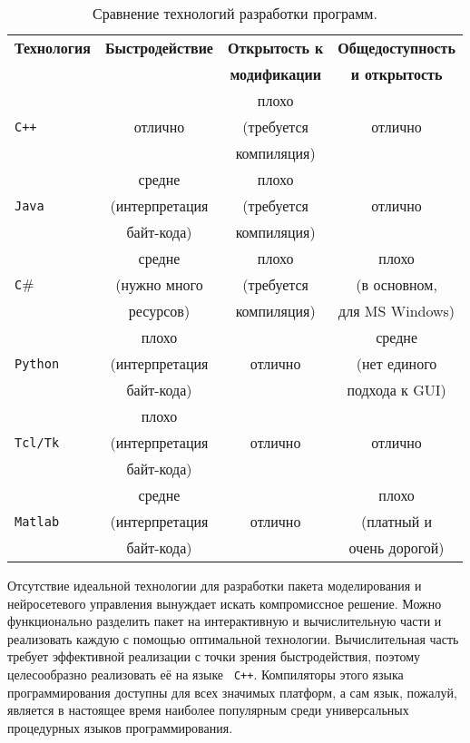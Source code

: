 \begin{table}[ht]
\centering
\caption{Сравнение технологий разработки программ.}
\label{tabl:sdk_tech}
\begin{tabular}{|l|c|c|c|}
\hline
\bf Технология & \bf Быстродействие & \bf Открытость к & \bf Общедоступность \\
             &                & \bf модификации  & \bf и открытость \\
\hline
             &                &  плохо       &              \\
\tt C++      &   отлично      & (требуется   & отлично      \\
             &                & компиляция)  &              \\
\hline
             &   средне       &  плохо       &              \\
\tt Java     & (интерпретация & (требуется   & отлично      \\
             & байт-кода)     & компиляция)  &              \\
\hline
             &   средне       &  плохо       & плохо        \\
\tt C$\#$    & (нужно много   & (требуется   & (в основном, \\
             & ресурсов)      & компиляция)  & для MS Windows) \\
\hline
            &   плохо        &              & средне       \\
\tt Python  & (интерпретация & отлично      & (нет единого \\
            & байт-кода)     &              & подхода к GUI) \\
\hline
           &   плохо        &              &              \\
\tt Tcl/Tk & (интерпретация & отлично      & отлично      \\
           & байт-кода)     &              &              \\
\hline
           &   средне       &              & плохо        \\
\tt Matlab & (интерпретация & отлично      & (платный и   \\
           & байт-кода)     &              & очень дорогой) \\
\hline
\end{tabular}
\end{table}

Отсутствие идеальной технологии для разработки пакета моделирования и
нейросетевого управления вынуждает искать компромиссное решение.
Можно функционально разделить пакет на интерактивную и вычислительную
части и реализовать каждую с помощью оптимальной технологии.
Вычислительная часть требует эффективной реализации с точки зрения
быстродействия, поэтому целесообразно реализовать её на языке {\tt
  C++}.  Компиляторы этого языка программирования доступны для всех
значимых платформ, а сам язык, пожалуй, является в настоящее время
наиболее популярным среди универсальных процедурных языков
программирования.

